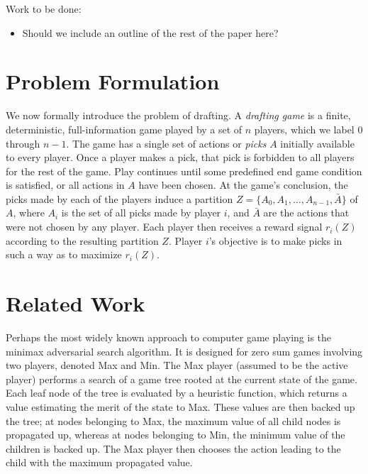 \documentclass[letterpaper]{article}
\numberwithin{equation}{section}
\numberwithin{theorem}{section}
\numberwithin{lemma}{section}
\numberwithin{df}{section}
\begin{document}

Work to be done:
\begin{itemize}
	\item Should we include an outline of the rest of the paper here?
\end{itemize}

\section{Problem Formulation}
\label{sec:Prob}


We now formally introduce the problem of drafting.  A \emph{drafting game} is a finite, deterministic, full-information game played by a set of $n$ players, which we label 0 through $n-1$.  The game has a single set of actions or \emph{picks} $A$ initially available to every player.  Once a player makes a pick, that pick is forbidden to all players for the rest of the game.  Play continues until some predefined end game condition is satisfied, or all actions in $A$ have been chosen.  At the game's conclusion, the picks made by each of the players induce a partition $Z = \{A_0, A_1, ..., A_{n-1}, \bar{A}\}$ of $A$, where $A_i$ is the set of all picks made by player $i$, and $\bar{A}$ are the actions that were not chosen by any player.  Each player then receives a reward signal $r_i(Z)$ according to the resulting partition $Z$.  Player $i$'s objective is to make picks in such a way as to maximize $r_i(Z)$.


\section{Related Work}

Perhaps the most widely known approach to computer game playing is the minimax adversarial search algorithm.  It is designed for zero sum games involving two players, denoted Max and Min.  The Max player (assumed to be the active player) performs a search of a game tree rooted at the current state of the game.  Each leaf node of the tree is evaluated by a heuristic function, which returns a value estimating the merit of the state to Max.  These values are then backed up the tree; at nodes belonging to Max, the maximum value of all child nodes is propagated up, whereas at nodes belonging to Min, the minimum value of the children is backed up.  The Max player then chooses the action leading to the child with the maximum propagated value.
\end{document}
